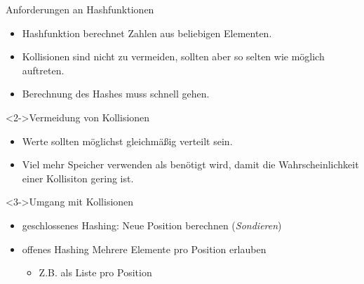\begin{frame}
    \begin{block}{Anforderungen an Hashfunktionen}
        \begin{itemize}
            \item Hashfunktion berechnet Zahlen aus beliebigen Elementen.
            \item Kollisionen sind nicht zu vermeiden,
                  sollten aber so selten wie möglich auftreten.
            \item Berechnung des Hashes muss schnell gehen.
        \end{itemize}
    \end{block}
    \begin{block}<2->{Vermeidung von Kollisionen}
        \begin{itemize}
            \item Werte sollten möglichst gleichmäßig verteilt sein.
            \item Viel mehr Speicher verwenden als benötigt wird,
                  damit die Wahrscheinlichkeit einer Kollisiton gering ist. 
        \end{itemize}
    \end{block}
    \begin{block}<3->{Umgang mit Kollisionen}
        \begin{itemize}
            \item \alert{geschlossenes Hashing}: Neue Position berechnen (\emph{Sondieren})
            \item \alert{offenes Hashing} Mehrere Elemente pro Position erlauben
            \begin{itemize}
                \item Z.B. als Liste pro Position
            \end{itemize}
        \end{itemize}
    \end{block}
\end{frame}

